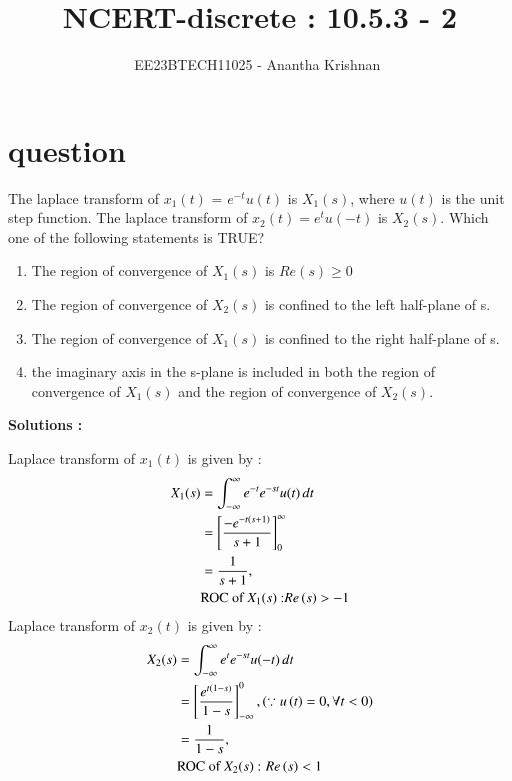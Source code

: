 \documentclass[journal,12pt,onecolumn]{IEEEtran}
\theoremstyle{remark}
\begin{document}

\vspace{3cm}

\title{NCERT-discrete : 10.5.3 - 2}
\author{EE23BTECH11025 - Anantha Krishnan $^{}$%
}
\maketitle
\bigskip



\section{question}

The laplace transform of $x_1(t)$ = $e^{-t}u(t)$ is $X_1(s)$, where $u(t)$ is the unit step function. The laplace transform of $x_2(t) = e^tu(-t)$ is $X_2(s)$. Which one of the following statements is TRUE?
\begin{enumerate}
    \item The region of convergence of $X_1(s)$ is $Re(s) \geq 0$
    \item The region of convergence of $X_2(s)$ is confined to the left half-plane of s.
    \item The region of convergence of $X_1(s)$ is confined to the right half-plane of s.
    \item the imaginary axis in the s-plane is included in both the region of convergence of $X_1(s)$ and the region of convergence of $X_2(s)$.
\end{enumerate}
 



\textbf{Solutions :}
    
Laplace transform of $x_1(t)$ is given by :
\begin{align}
    X_1(s) &=  \int_{-\infty}^{\infty} e^{-t}e^{-st}u(t) \,dt\\
       &=  \left[\frac{-e^{-t\left(s+1\right)}}{s+1}\right]_{0}^{\infty}  \\
&= \frac{1}{s+1} , \\ &\text{ROC of $X_1(s)$ :} Re\left(s\right) > -1
\end{align}
Laplace transform of $x_2(t)$ is given by :
\begin{align}
    X_2(s) &=  \int_{-\infty}^{\infty} e^{t}e^{-st}u(-t) \,dt\\
     &=  \left[\frac{e^{t\left(1-s\right)}}{1-s}\right]_{-\infty}^{0} , \left(\because u\left(t\right) =0 ,\forall t<0\right)\\
&= \frac{1}{1-s} , \\ &\text{ROC of $X_2(s)$ : }Re\left(s\right) < 1
\end{align}
\end{document}
